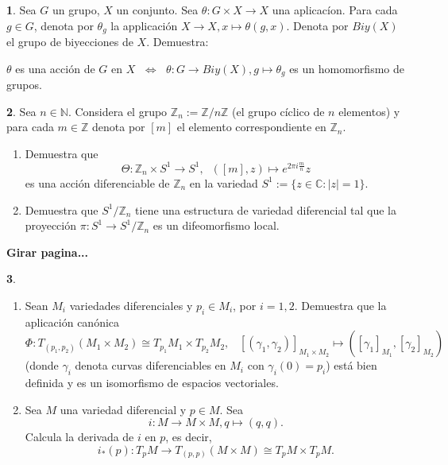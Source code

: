 \documentclass[12pt,a4paper]{report}
\theoremstyle{definition}
\newtheorem{ex}{}
\newcommand{\NN}{\ensuremath{\mathbb N}}
\newcommand{\ZZ}{\ensuremath{\mathbb Z}}
\newcommand{\CC}{\ensuremath{\mathbb C}}
\begin{document}
\begin{ex} Sea $G$ un grupo, $X$ un conjunto. Sea $\theta \colon G \times X \to X$ una aplicac\'ion. Para cada $g\in G$, denota por $\theta_g$ la applicaci\'on $X \to X, x \mapsto \theta(g,x)$. Denota por $Biy(X)$ el grupo de biyecciones de $X$. Demuestra:

\noindent $\theta$ es una acci\'on de $G$ en $X$ $\;\Leftrightarrow\;$   $\theta \colon G \to Biy(X), g \mapsto \theta_g$ es un homomorfismo de grupos. 

\end{ex}


 \begin{ex}
Sea $n\in \NN$. Considera el grupo $\ZZ_n:=\ZZ/n\ZZ$ (el grupo c\'iclico de $n$ elementos)
y para cada $m\in \ZZ$ denota por $[m]$ el elemento correspondiente en $\ZZ_n$.
\begin{enumerate}
\item
Demuestra que 
$$\Theta \colon \ZZ_n \times S^1 \to S^1,\;\;([m],z)\mapsto e^{2\pi i \frac{m}{n}}z$$
es una acci\'on diferenciable de $\ZZ_n$ en la variedad $S^1:=\{z\in \CC:|z|=1\}$.
\item
 Demuestra que $S^1/\ZZ_n$ tiene una estructura de variedad diferencial tal que la proyecci\'on $\pi \colon S^1 \to S^1/\ZZ_n$ es un difeomorfismo local.
\end{enumerate}
\end{ex}
 
\noindent \textbf{Girar pagina...} 
\begin{ex}
\begin{enumerate}
\item Sean $M_i$ variedades diferenciales y $p_i\in M_i$, por $i=1,2$. Demuestra que la aplicaci\'on can\'onica
$$\Phi \colon T_{(p_1,p_2)}(M_1\times M_2)\cong T_{p_1}M_1\times 
T_{p_2}M_2,\;\;\; [(\gamma_1,\gamma_2)]_{M_1\times M_2} \mapsto ([\gamma_1]_{M_1},[\gamma_2]_{M_2})$$
(donde $\gamma_i$ denota curvas diferenciables en $M_i$ con $\gamma_i(0)=p_i$) est\'a bien definida y es un isomorfismo de espacios vectoriales.

\item Sea $M$ una variedad diferencial y $p\in M$. Sea
$$i \colon M\to M\times M, q\mapsto (q,q).$$
Calcula la derivada de $i$ en $p$, es decir,
$$i_*(p)\colon T_pM \to T_{(p,p)}(M\times M)\cong T_{p}M\times 
T_{p}M.$$
\end{enumerate}
\end{ex}



 
\end{document}
